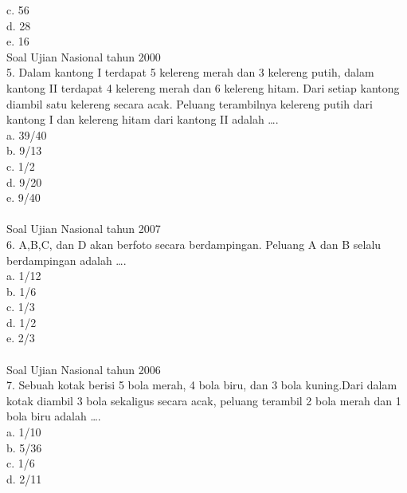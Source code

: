 \documentclass[11pt,fleqn]{book} %
\begin{document}
c. 56\\

d. 28\\

e. 16\\

Soal Ujian Nasional tahun 2000\\
5. Dalam kantong I terdapat 5 kelereng merah dan 3 kelereng putih, dalam kantong II terdapat 4 kelereng merah dan 6 kelereng hitam. Dari setiap kantong diambil satu kelereng secara acak. Peluang terambilnya kelereng putih dari kantong I dan kelereng hitam dari kantong II adalah ….\\

a. 39/40\\

b. 9/13\\

c. 1/2\\

d. 9/20\\

e. 9/40\\
\\

Soal Ujian Nasional tahun 2007\\
6. A,B,C, dan D akan berfoto secara berdampingan. Peluang A dan B selalu berdampingan adalah ….\\

a. 1/12\\

b. 1/6\\

c. 1/3\\

d. 1/2\\

e. 2/3\\
\\

Soal Ujian Nasional tahun 2006\\
7. Sebuah kotak berisi 5 bola merah, 4 bola biru, dan 3 bola kuning.Dari dalam kotak diambil 3 bola sekaligus secara acak, peluang terambil 2 bola merah dan 1 bola biru adalah ….\\

a. 1/10\\

b. 5/36\\

c. 1/6\\

d. 2/11\\
\end{document}
